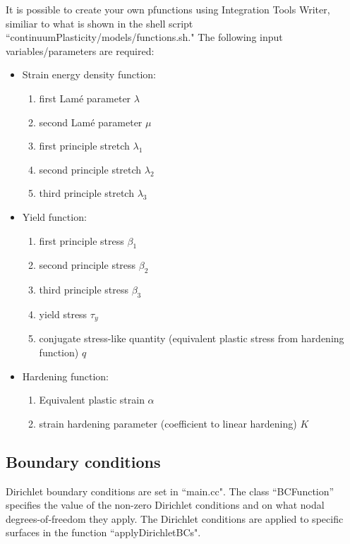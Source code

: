 \documentclass[10pt]{article}
\begin{document}
It is possible to create your own pfunctions using Integration Tools Writer, similiar to what is shown in the shell script ``continuumPlasticity/models/functions.sh." The following input variables/parameters are required:
\begin{itemize}
\itemsep-0.5em
\item Strain energy density function:
\vspace{-3mm}
\begin{enumerate}
\itemsep-0.5em 
\item first Lam\'e parameter $\lambda$
\item second Lam\'e parameter $\mu$
\item first principle stretch $\lambda_1$
\item second principle stretch $\lambda_2$
\item third principle stretch $\lambda_3$
\end{enumerate}
%
\item Yield function: 
\begin{enumerate}
\vspace{-3mm}
\itemsep-0.5em
\item first principle stress $\beta_1$
\item second principle stress $\beta_2$
\item third principle stress $\beta_3$
\item yield stress $\tau_y$
\item conjugate stress-like quantity (equivalent plastic stress from hardening function) $q$
\end{enumerate}
%
\item Hardening function: 
\begin{enumerate}
\vspace{-3mm}
\itemsep-0.5em
\item Equivalent plastic strain $\alpha$
\item strain hardening parameter (coefficient to linear hardening) $K$
\end{enumerate}
\end{itemize}

\subsection{Boundary conditions}
Dirichlet boundary conditions are set in ``main.cc". The class ``BCFunction'' specifies the value of the non-zero Dirichlet conditions and on what nodal degrees-of-freedom they apply. The Dirichlet conditions are applied to specific surfaces in the function ``applyDirichletBCs".
\end{document}
